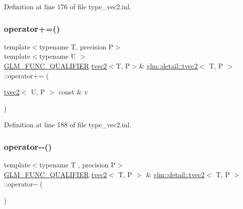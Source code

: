 Definition at line 176 of file type\+\_\+vec2.\+inl.

\mbox{\label{structglm_1_1detail_1_1tvec2_ab3b31e72f4dfa1ad16b84ac277ea83e4}} 
\subsubsection{\texorpdfstring{operator+=()}{operator+=()}\hspace{0.1cm}{\footnotesize\ttfamily [4/4]}}
{\footnotesize\ttfamily template$<$typename T, precision P$>$ \\
template$<$typename U $>$ \\
\hyperlink{setup_8hpp_a33fdea6f91c5f834105f7415e2a64407}{G\+L\+M\+\_\+\+F\+U\+N\+C\+\_\+\+Q\+U\+A\+L\+I\+F\+I\+ER} \hyperlink{structglm_1_1detail_1_1tvec2}{tvec2}$<$T, P$>$\& \hyperlink{structglm_1_1detail_1_1tvec2}{glm\+::detail\+::tvec2}$<$ T, P $>$\+::operator+= (\begin{DoxyParamCaption}\item[{\hyperlink{structglm_1_1detail_1_1tvec2}{tvec2}$<$ U, P $>$ const \&}]{v }\end{DoxyParamCaption})}



Definition at line 188 of file type\+\_\+vec2.\+inl.

\mbox{\label{structglm_1_1detail_1_1tvec2_a0ce16e6435066b8722def0673e5a63e2}} 
\subsubsection{\texorpdfstring{operator-\/-\/()}{operator--()}\hspace{0.1cm}{\footnotesize\ttfamily [1/2]}}
{\footnotesize\ttfamily template$<$typename T , precision P$>$ \\
\hyperlink{setup_8hpp_a33fdea6f91c5f834105f7415e2a64407}{G\+L\+M\+\_\+\+F\+U\+N\+C\+\_\+\+Q\+U\+A\+L\+I\+F\+I\+ER} \hyperlink{structglm_1_1detail_1_1tvec2}{tvec2}$<$ T, P $>$ \& \hyperlink{structglm_1_1detail_1_1tvec2}{glm\+::detail\+::tvec2}$<$ T, P $>$\+::operator-\/-\/ (\begin{DoxyParamCaption}{ }\end{DoxyParamCaption})}



